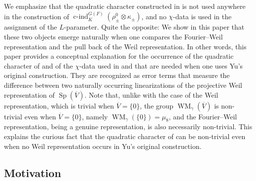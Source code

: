 \documentclass{article}
\def\ol#1{\overline{#1}}
\DeclareMathOperator{\Sp}{Sp}
\DeclareMathOperator{\cind}{c-ind}
\theoremstyle{definition}
\numberwithin{equation}{subsection}
\renewcommand{\-}{\hyp{}}
\DeclareMathOperator{\WM}{WM}
\newcommand{\oV}{\ol{V}}
\begin{document}
We emphasize that the quadratic character constructed in \cite{FKS23} is not used anywhere in the construction of $\cind_K^{G(F)}(\rho^0_{\pm} \otimes \kappa_{\pm})$, and no $\chi$-data is used in the assignment of the $L$-parameter. Quite the opposite: We show in this paper that these two objects emerge naturally when one compares the Fourier--Weil representation and the pull back of the Weil representation. In other words, this paper provides a conceptual explanation for the occurrence of the quadratic character of \cite{FKS23} and of the $\chi$-data used in \cite{KalRSP} and \cite{KalSLP} that are needed when one uses Yu's original construction. They are recognized as error terms that measure the difference between two naturally occurring linearizations of the projective Weil representation of $\Sp(\oV)$. 
Note that, unlike with the case of the Weil representation, which is trivial when $\oV=\{0\}$, the group $\WM_\gamma(\ol{V})$ is non-trivial even when $\oV=\{0\}$, namely $\WM_\gamma(\{0\})=\mu_8$, and the Fourier--Weil representation, being a genuine representation, is also necessarily non-trivial. This explains the curious fact that the quadratic character of \cite{FKS23} can be non-trivial even when no Weil representation occurs in Yu's original construction.






\subsection{Motivation}\label{sub:motivation}
\end{document}
